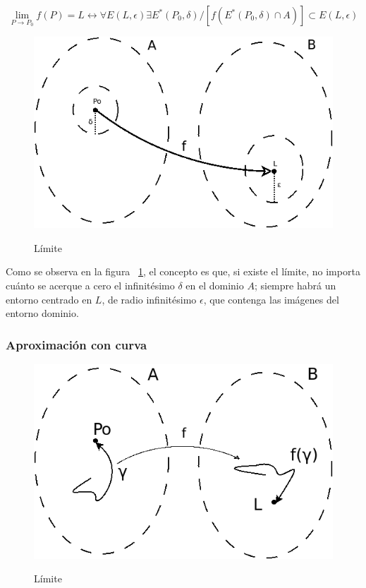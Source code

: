 \documentclass{article}
\begin{document}
\begin{equation}
\lim_{P \rightarrow P_0}f(P) = L \longleftrightarrow \forall E(L, \epsilon) \exists E^*(P_0, \delta) / [f(E^*(P_0, \delta) \cap A)] \subset E(L, \epsilon)
\end{equation}

\begin{figure}[t]
\caption{Límite}
\includegraphics[scale=0.75]{img/teo_fig002_limite.png} 
\centering
\label{fig:limite}
\end{figure}

Como se observa en la figura ~\ref{fig:limite}, el concepto es que, si existe el límite, no importa cuánto se acerque a cero el infinitésimo $\delta$ en el dominio $A$; siempre habrá un entorno centrado en $L$, de radio infinitésimo $\epsilon$, que contenga las imágenes del entorno dominio.

\subsubsection{Aproximación con curva}

\begin{figure}[t]
\caption{Límite}
\includegraphics[scale=0.75]{img/teo_fig003_limite_curva.png} 
\centering
\label{fig:limite_curva}
\end{figure}
\end{document}
